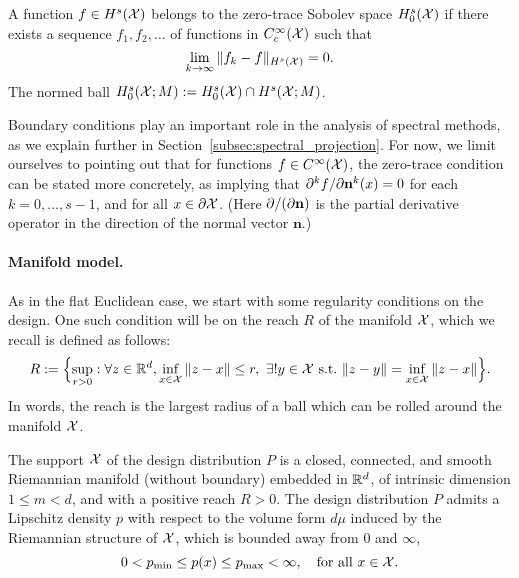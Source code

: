 \begin{definition}
	\label{def:zero_trace_sobolev_space}
	A function $f \in H^s(\mathcal{X})$ belongs to the zero-trace Sobolev space $H_0^s(\mathcal{X})$ if there exists a sequence $f_1,f_2,\ldots$ of functions in $C_c^{\infty}(\mathcal{X})$ such that
	\begin{equation*}
	\lim_{k \to \infty}\|f_k - f\|_{H^s(\mathcal{X})} = 0.
	\end{equation*}
	The normed ball $H_0^{s}(\mathcal{X};M) := H_0^{s}(\mathcal{X}) \cap H^{s}(\mathcal{X};M)$.
\end{definition}
Boundary conditions play an important role in the analysis of spectral methods, as we explain further in Section~\ref{subsec:spectral_projection}. For now, we limit ourselves to pointing out that for functions $f \in C^\infty(\mathcal{X})$, the zero-trace condition can be stated more concretely, as implying that $\partial^{k}f/\partial{\bf n}^k(x) = 0$ for each $k = 0,\ldots,s - 1$, and for all $x \in \partial\mathcal{X}$. (Here $\partial/(\partial {\bf n})$ is the partial derivative operator in the direction of the normal vector $\mathbf{n}$.)
\paragraph{Manifold model.}
As in the flat Euclidean case, we start with some regularity conditions on the design. One such condition will be on the reach $R$ of the manifold $\mathcal{X}$, which we recall is defined as follows:
\begin{equation*}
R := \Bigl\{\sup_{r > 0}: \forall z \in \mathbb{R}^d, \inf_{x \in \mathcal{X}} \|z - x\| \leq r, ~\exists! y \in \mathcal{X}~\mathrm{s.t.}~\|z - y\| = \inf_{x \in \mathcal{X}} \|z - x\|\Bigr\}.
\end{equation*}
In words, the reach is the largest radius of a ball which can be rolled around the manifold $\mathcal{X}$.
\begin{definition}
	\label{def:model_manifold}
	The support $\mathcal{X}$ of the design distribution $P$ is a closed, connected, and smooth Riemannian manifold (without boundary) embedded in $\mathbb{R}^d$, of intrinsic dimension $1 \leq m < d$, and with a positive reach $R > 0$. The design distribution $P$ admits a Lipschitz density $p$ with respect to the volume form $d\mu$ induced by the Riemannian structure of $\mathcal{X}$, which is bounded away from $0$ and $\infty$,
	\begin{equation*}
	0 < p_{\min} \leq p(x) \leq p_{\max} < \infty, \quad \textrm{for all $x \in \mathcal{X}$.}
	\end{equation*}
\end{definition}

